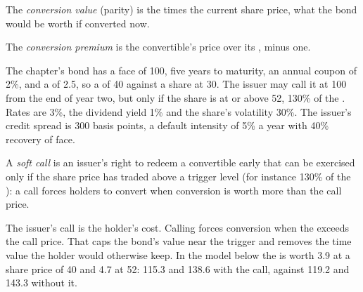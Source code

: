 \begin{definition}\label{def:dv:convertibles-and-the-credit-equity-link:value}
The \emph{conversion value} (parity) is the  times the current share price, what the bond
would be worth if converted now.
\end{definition}

\begin{definition}\label{def:dv:convertibles-and-the-credit-equity-link:premium}
The \emph{conversion premium} is the convertible's price over its , minus one.
\end{definition}

The chapter's bond has a face of 100, five years to maturity, an annual coupon of 2\%, and a  of 2.5, so a  of 40 against a share at 30. The issuer may call it at 100 from the end of year two, but only if the share is at or above 52,
130\% of the . Rates are 3\%, the dividend yield 1\% and the share's volatility 30\%. The issuer's credit spread is 300
basis points, a default intensity of 5\% a year with 40\% recovery of face.

\begin{definition}\label{def:dv:convertibles-and-the-credit-equity-link:softcall}
A \emph{soft call} is an issuer's right to redeem a convertible early that can be exercised only if the share
price has traded above a trigger level (for instance 130\% of the ): a call forces holders
to convert when conversion is worth more than the call price.
\end{definition}

The issuer's call is the holder's cost. Calling forces conversion when the  exceeds the call price. That caps the
bond's value near the trigger and removes the time value the holder would otherwise keep. In the model below the  is worth
3.9 at a share price of 40 and 4.7 at 52: 115.3 and 138.6 with the call, against 119.2 and 143.3 without it.

